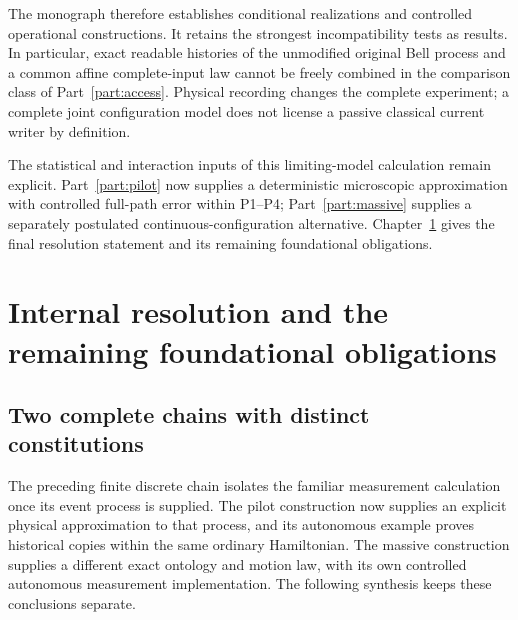 \documentclass[11pt,oneside,openany]{book}
\theoremstyle{definition}
\theoremstyle{remark}\newtheorem{remark}[theorem]{Remark}
\begin{document}
The monograph therefore establishes conditional realizations and controlled operational constructions. It retains the strongest incompatibility tests as results. In particular, exact readable histories of the unmodified original Bell process and a common affine complete-input law cannot be freely combined in the comparison class of Part~\ref{part:access}. Physical recording changes the complete experiment; a complete joint configuration model does not license a passive classical current writer by definition.

The statistical and interaction inputs of this limiting-model calculation remain explicit. Part~\ref{part:pilot} now supplies a deterministic microscopic approximation with controlled full-path error within P1--P4; Part~\ref{part:massive} supplies a separately postulated continuous-configuration alternative. Chapter~\ref{syn:chapter} gives the final resolution statement and its remaining foundational obligations.


\chapter{Internal resolution and the remaining foundational obligations}
\label{syn:chapter}

\section{Two complete chains with distinct constitutions}
The preceding finite discrete chain isolates the familiar measurement
calculation once its event process is supplied. The pilot construction
now supplies an explicit physical approximation to that process, and
its autonomous example proves historical copies within the same
ordinary Hamiltonian. The massive construction supplies a different
exact ontology and motion law, with its own controlled autonomous
measurement implementation. The following synthesis keeps these
conclusions separate.
\end{document}
